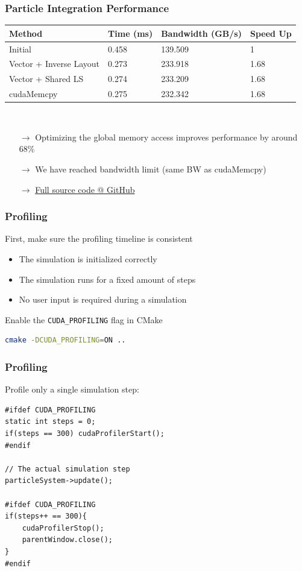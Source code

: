 \documentclass[aspectratio=169,handout]{beamer}
\begin{document}
\begin{frame}[fragile]
\frametitle{Particle Integration Performance}
	\begin{tabular}{l|l|l|l}
	\textbf{Method} & \textbf{Time (ms)} & \textbf{Bandwidth (GB/s)} & \textbf{Speed Up} \\	
	\hline
	Initial & 0.458  & 139.509 & 1 \\
	Vector + Inverse Layout & 0.273  &       233.918 & 1.68 \\
	Vector + Shared LS & 0.274   &    233.209 & 1.68 \\
	cudaMemcpy & 0.275   &    232.342 & 1.68  
\end{tabular}
\\
\vspace{0.5cm}
\begin{itemize}
	\item[$\rightarrow$] Optimizing the global memory access improves performance by around 68\%
	\item[$\rightarrow$] We have reached bandwidth limit (same BW as cudaMemcpy)
	\item[$\rightarrow$] \href{https://github.com/darglein/saiga/blob/master/samples/cuda/globalMemory/main.cu}{Full source code @ GitHub}
\end{itemize}
\end{frame}


\begin{frame}[fragile]
\frametitle{Profiling}
First, make sure the profiling timeline is consistent
\begin{itemize}
	\item The simulation is initialized correctly
	\item The simulation runs for a fixed amount of steps
	\item No user input is required during a simulation
\end{itemize}
Enable the \texttt{CUDA\_PROFILING} flag in CMake
\begin{lstlisting}[language=bash]
cmake -DCUDA_PROFILING=ON ..
\end{lstlisting}
\end{frame}


\begin{frame}[fragile]
\frametitle{Profiling}
Profile only a single simulation step:

\begin{lstlisting}
#ifdef CUDA_PROFILING
static int steps = 0;
if(steps == 300) cudaProfilerStart();
#endif

// The actual simulation step
particleSystem->update();

#ifdef CUDA_PROFILING
if(steps++ == 300){
	cudaProfilerStop();
	parentWindow.close();
}
#endif

\end{lstlisting}
\end{frame}
\end{document}
